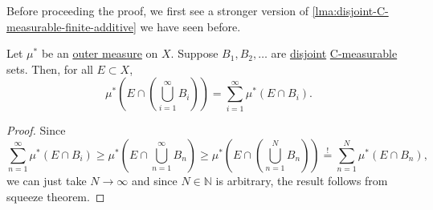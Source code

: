 Before proceeding the proof, we first see a stronger version of \autoref{lma:disjoint-C-measurable-finite-additive} we have seen before.
\begin{lemma}\label{lma:disjoint-C-measurable-infinite-additive}
	Let \(\mu^{\ast} \) be an \hyperref[def:outer-measure]{outer measure} on \(X\). Suppose \(B_1, B_2, \dots\) are \underline{disjoint} \hyperref[def:C-measurable]{C-measurable} sets. Then, for all \(E\subset X\),
	\[
		\mu^{\ast} \left(E\cap \left(\bigcup_{i=1}^{\infty} B_{i}\right)\right) = \sum_{i=1}^{\infty} \mu^{\ast} \left(E\cap B_i\right).
	\]
\end{lemma}
\begin{proof}
	Since
	\[
		\sum_{n=1}^{\infty} \mu^{\ast} (E\cap B_{i}) \geq \mu^{\ast} \left(E\cap \bigcup_{n=1}^{\infty} B_{n}\right) \geq\mu^{\ast} \left(E\cap \left(\bigcup_{n=1}^{N} B_{n}\right)\right) \overset{\hyperref[lma:disjoint-C-measurable-finite-additive]{!}}{=} \sum_{n=1}^{N} \mu^{\ast} \left(E\cap B_n\right),
	\]
	we can just take \(N\to \infty \) and since \(N\in\mathbb{N} \) is arbitrary, the result follows from squeeze theorem.
\end{proof}

